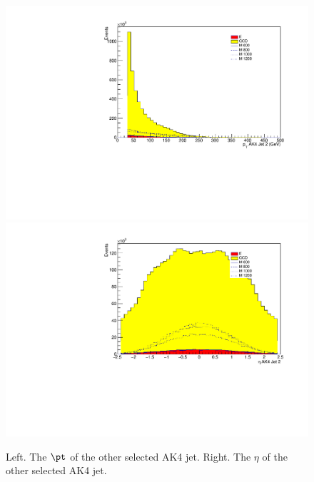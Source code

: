 \begin{figure}[thb!]
\begin{center}
\includegraphics[scale=0.34]{F5/shapeptJ2.pdf}
\includegraphics[scale=0.34]{F5/shapeetaJ2.pdf}\\
\end{center}
\caption{Left. The $\pt$ of the other selected AK4 jet. Right. The $\eta$ of the other selected AK4 jet.}
\label{fig:AK42pteta}
\end{figure} 

